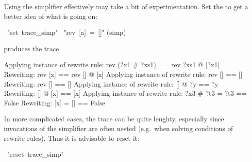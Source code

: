 \begin{isabelle}%
%
\begin{isamarkuptext}%
Using the simplifier effectively may take a bit of experimentation.  Set the
  to get a better idea of what is going
on:%
\end{isamarkuptext}%
~{"}set~trace\_simp{"}\isanewline
{}~{"}rev~[a]~=~[]{"}\isanewline
{}(simp)%
\begin{isamarkuptxt}%
\noindent
produces the trace

\begin{ttbox}
Applying instance of rewrite rule:
rev (?x1 \# ?xs1) == rev ?xs1 @ [?x1]
Rewriting:
rev [x] == rev [] @ [x]
Applying instance of rewrite rule:
rev [] == []
Rewriting:
rev [] == []
Applying instance of rewrite rule:
[] @ ?y == ?y
Rewriting:
[] @ [x] == [x]
Applying instance of rewrite rule:
?x3 \# ?t3 = ?t3 == False
Rewriting:
[x] = [] == False
\end{ttbox}

In more complicated cases, the trace can be quite lenghty, especially since
invocations of the simplifier are often nested (e.g.\ when solving conditions
of rewrite rules). Thus it is advisable to reset it:%
\end{isamarkuptxt}%
~{"}reset~trace\_simp{"}\isanewline
\end{isabelle}%
